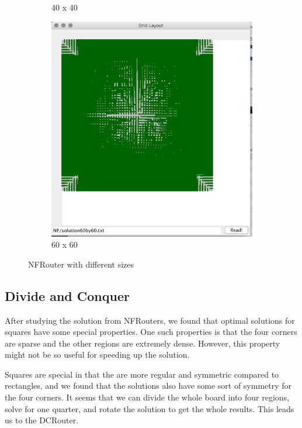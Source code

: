 \documentclass{article}
\begin{document}
\begin{spacing}{1.1}
\begin{figure}[H]
\begin{subfigure}{0.3\textwidth}
            \caption{40 x 40}
        \end{subfigure}
        \begin{subfigure}{0.3\textwidth}
            \includegraphics[width = \textwidth]{NF3.png}
            \caption{60 x 60}
        \end{subfigure}
        \caption{NFRouter with different sizes}
    \end{figure}
    \subsection{Divide and Conquer}
    \label{DC}
    After studying the solution from NFRouters, we found that optimal solutions for squares have some special properties. One such properties is that the four corners are sparse and the other regions are extremely dense. However, this property
    might not be so useful for speeding up the solution.

    Squares are special in that the are more regular and symmetric compared to rectangles, and we found that the solutions also have some sort of symmetry for the four corners. It seems that we can divide the whole board into four regions, solve for
    one quarter, and rotate the solution to get the whole results. This leads us to the DCRouter.


\end{spacing}
\end{document}
